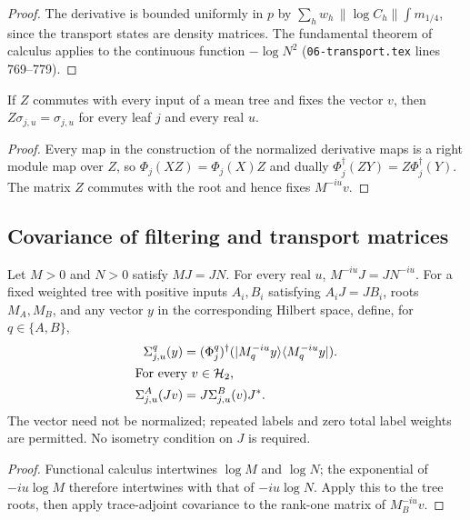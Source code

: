 \begin{proof}\leanok
    The derivative is bounded uniformly in $p$ by
    $\sum_hw_h\,\|\log C_h\|\int m_{1/4}$, since the transport states are
    density matrices. The fundamental theorem of calculus applies to the
    continuous function $-\log N^2$ (\texttt{06-transport.tex} lines 769--779).
\end{proof}

\begin{lemma}\label{lem:transport_states_commutant}
    \leanok
    If $Z$ commutes with every input of a mean tree and fixes the vector $v$, then
    $Z\sigma_{j,u}=\sigma_{j,u}$ for every leaf $j$ and every real $u$.
\end{lemma}

\begin{proof}\leanok
    Every map in the construction of the normalized derivative maps is a right
    module map over $Z$, so $\Phi_j(XZ)=\Phi_j(X)Z$ and dually
    $\Phi_j^\dagger(ZY)=Z\Phi_j^\dagger(Y)$. The matrix $Z$ commutes with the root
    and hence fixes $M^{-iu}v$.
\end{proof}

\subsection{Covariance of filtering and transport matrices}

\begin{theorem}
\label{thm:transport_intertwiner_state}
\leanok
{}
Let $M>0$ and $N>0$ satisfy $MJ=JN$. For every real $u$,
$M^{-iu}J=JN^{-iu}$. For a fixed weighted tree with positive inputs
$A_i,B_i$ satisfying $A_iJ=JB_i$, roots $M_A,M_B$, and any vector
$y$ in the corresponding Hilbert space, define, for $q\in\{A,B\}$,
\begin{align}
 \Sigma_{j,u}^q(y)&=(\Phi_j^q)^\dagger
   (|M_q^{-iu}y\rangle\langle M_q^{-iu}y|).
 \label{eq:transport_intertwiner_matrix}\\
 \intertext{For every $v\in\mathcal H_2$,}
 \Sigma_{j,u}^A(Jv)&=J\Sigma_{j,u}^B(v)J^*.
 \label{eq:transport_intertwiner_state}
\end{align}
The vector need not be normalized; repeated labels and zero total label weights
are permitted. No isometry condition on $J$ is required.
\end{theorem}
\begin{proof}\leanok
{}
Functional calculus intertwines $\log M$ and $\log N$; the exponential of
$-iu\log M$ therefore intertwines with that of $-iu\log N$. Apply this to
the tree roots, then apply trace-adjoint covariance to the rank-one matrix of
$M_B^{-iu}v$.
\end{proof}

